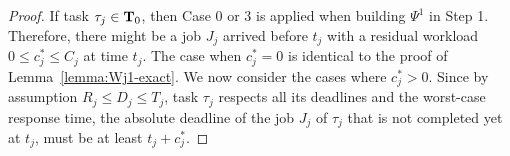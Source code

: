 \begin{proof}
If task $\tau_j \in {\bf T}_0$, then Case 0 or 3 is applied when building $\Psi^1$ in Step 1. %
  Therefore, there might be a job $J_j$ arrived before
  $t_j$ with a residual workload $0 \leq c_j^* \leq C_j$ at time
  $t_j$. %
  The case when $c_j^*=0$ is identical to the proof of Lemma~\ref{lemma:Wj1-exact}. We now consider the cases where $c_j^* > 0$.
  Since by assumption $R_j \leq D_j \leq T_j$, task 
  $\tau_j$ respects all its deadlines and the
  worst-case response time, the absolute deadline of the job $J_j$ of $\tau_j$ that is not completed yet at $t_j$, must be at least $t_j + c_j^*$. %

\end{proof}
